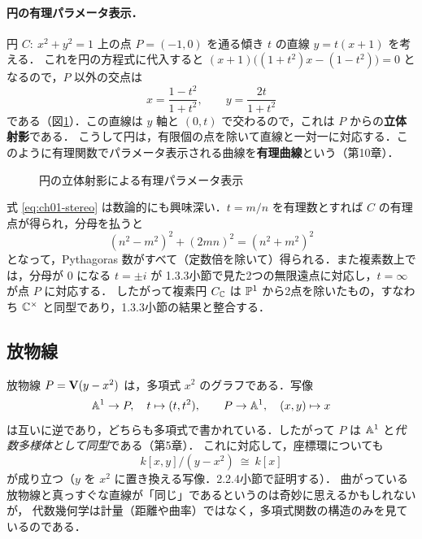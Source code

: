 \paragraph{円の有理パラメータ表示．}
円 $C:\ x^2+y^2=1$ 上の点 $P=(-1,0)$ を通る傾き $t$ の直線 $y=t(x+1)$ を考える．
これを円の方程式に代入すると $(x+1)\big((1+t^2)x-(1-t^2)\big)=0$ となるので，$P$ 以外の交点は
\begin{equation}\label{eq:ch01-stereo}
  x=\frac{1-t^2}{1+t^2},\qquad y=\frac{2t}{1+t^2}
\end{equation}
である（図\ref{fig:ch01-stereo}）．この直線は $y$ 軸と $(0,t)$ で交わるので，これは $P$ からの\textbf{立体射影}である．
こうして円は，有限個の点を除いて直線と一対一に対応する．このように有理関数でパラメータ表示される曲線を\textbf{有理曲線}という（第10章）．

\begin{figure}[H]
\centering
{}
\caption{円の立体射影による有理パラメータ表示}
\label{fig:ch01-stereo}
\end{figure}

式 \eqref{eq:ch01-stereo} は数論的にも興味深い．$t=m/n$ を有理数とすれば $C$ の有理点が得られ，分母を払うと
\[
  (n^2-m^2)^2+(2mn)^2=(n^2+m^2)^2
\]
となって，Pythagoras 数がすべて（定数倍を除いて）得られる．また複素数上では，分母が $0$ になる $t=\pm i$ が
1.3.3小節で見た2つの無限遠点に対応し，$t=\infty$ が点 $P$ に対応する．
したがって複素円 $C_{\mathbb{C}}$ は $\mathbb{P}^1$ から2点を除いたもの，すなわち $\mathbb{C}^\times$ と同型であり，1.3.3小節の結果と整合する．

\subsection{放物線}

放物線 $P=\mathbf{V}(y-x^2)$ は，多項式 $x^2$ のグラフである．写像
\[
  \mathbb{A}^1\to P,\quad t\mapsto(t,t^2),\qquad P\to\mathbb{A}^1,\quad (x,y)\mapsto x
\]
は互いに逆であり，どちらも多項式で書かれている．したがって $P$ は $\mathbb{A}^1$ と\emph{代数多様体として同型}である（第5章）．
これに対応して，座標環についても
\[
  k[x,y]/(y-x^2)\ \cong\ k[x]
\]
が成り立つ（$y$ を $x^2$ に置き換える写像．2.2.4小節で証明する）．
曲がっている放物線と真っすぐな直線が「同じ」であるというのは奇妙に思えるかもしれないが，
代数幾何学は計量（距離や曲率）ではなく，多項式関数の構造のみを見ているのである．


